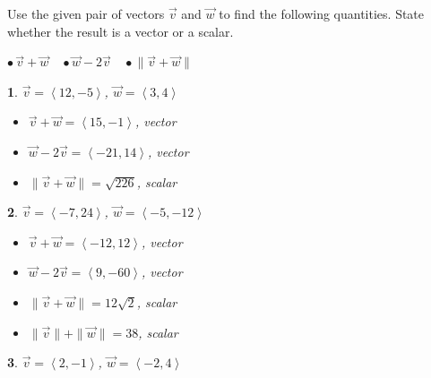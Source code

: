 \documentclass{amsbook}
\newtheorem{exc}{}
\newenvironment{ex}{\begin{exc}\normalfont}{\end{exc}}
\numberwithin{section}{chapter}
\numberwithin{equation}{chapter}
\begin{document}
Use the given pair of vectors $\vec{v}$ and $\vec{w}$ to find the following quantities.  State whether the result is a vector or a scalar.  

\hspace{.15in} $\bullet \, \vec{v} + \vec{w} \;\;\;$ \hfill $\bullet \, \vec{w}  - 2\vec{v} \;\;\;$ \hfill $\bullet \, \| \vec{v} + \vec{w} \| \;\;\;$

\begin{multicols}{2}
	
	\begin{ex}
		 $\vec{v} = \left<12, -5\right>$, $\vec{w} = \left<3, 4\right>$ 
		\begin{sol}
				\begin{itemize}
					
					\item  $\vec{v} + \vec{w} = \left<15,-1 \right> $, vector
					\item  $\vec{w}  - 2\vec{v}  = \left<-21,14 \right>$, vector
					
					\item $\| \vec{v} + \vec{w} \| = \sqrt{226}$, scalar
			\end{itemize}
		\end{sol}
	\end{ex}
	
	\begin{ex}
		$\vec{v} = \left<-7, 24 \right>$, $\vec{w} = \left<-5, -12\right>$
		\begin{sol}
				\begin{itemize}
					
					\item  $\vec{v} + \vec{w} = \left<-12,12 \right> $, vector
					\item  $\vec{w}  - 2\vec{v}  = \left<9,-60 \right>$, vector
					
					\item $\| \vec{v} + \vec{w} \| = 12\sqrt{2}$, scalar
					\item  $\| \vec{v} \| + \| \vec{w}\| = 38$, scalar
					
				\end{itemize}

		\end{sol}
	\end{ex}

\begin{ex}
	 $\vec{v} = \left<2, -1 \right>$, $\vec{w} = \left<-2, 4 \right>$
	\begin{sol}
			\begin{itemize}
				

\end{itemize}
\end{sol}
\end{ex}
\end{multicols}
\end{document}
